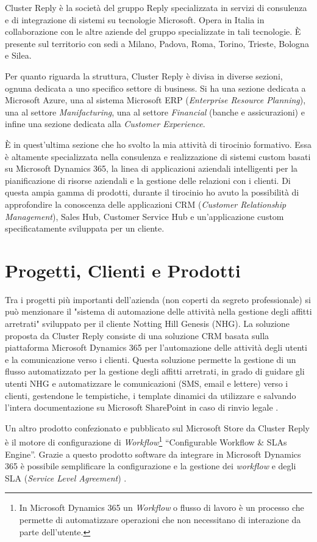 Cluster Reply è la società del gruppo Reply specializzata in servizi di consulenza e di integrazione di sistemi su tecnologie Microsoft. Opera in Italia in collaborazione con le altre aziende del gruppo specializzate in tali tecnologie. È presente sul territorio con sedi a Milano, Padova, Roma, Torino, Trieste, Bologna e Silea. 

Per quanto riguarda la struttura, Cluster Reply è divisa in diverse sezioni, ognuna dedicata a uno specifico settore di business. Si ha una sezione dedicata a Microsoft Azure, una al sistema Microsoft ERP (\textit{Enterprise Resource Planning}), una al settore \textit{Manifacturing}, una al settore \textit{Financial} (banche e assicurazioni) e infine una sezione dedicata alla \textit{Customer Experience}.

È in quest'ultima sezione che ho svolto la mia attività di tirocinio formativo. Essa è altamente specializzata nella consulenza e realizzazione di sistemi custom basati su Microsoft Dynamics 365, la linea di applicazioni aziendali intelligenti per la pianificazione di risorse aziendali e la gestione delle relazioni con i clienti. Di questa ampia gamma di prodotti, durante il tirocinio ho avuto la possibilità di approfondire la conoscenza delle applicazioni CRM (\textit{Customer Relationship Management}), Sales Hub, Customer Service Hub e un'applicazione custom specificatamente sviluppata per un cliente.

\section{Progetti, Clienti e Prodotti}
Tra i progetti più importanti dell'azienda (non coperti da segreto professionale) si può menzionare il "sistema di automazione delle attività nella gestione degli affitti arretrati" sviluppato per il cliente Notting Hill Genesis (NHG). La soluzione proposta da Cluster Reply consiste di una soluzione CRM basata sulla piattaforma Microsoft Dynamics 365 per l'automazione  delle attività degli utenti e la comunicazione verso i clienti. Questa soluzione permette la gestione di un flusso automatizzato per la gestione degli affitti arretrati, in grado di guidare gli utenti NHG e automatizzare le comunicazioni (SMS, email e lettere) verso i clienti, gestendone le tempistiche, i template dinamici da utilizzare e salvando l'intera documentazione su Microsoft SharePoint in caso di rinvio legale \cite{NHG}.

Un altro prodotto confezionato e pubblicato sul Microsoft Store da Cluster Reply è il motore di configurazione di \textit{Workflow}\footnote{In Microsoft Dynamics 365 un \textit{Workflow} o flusso di lavoro è un processo che permette di automatizzare operazioni che non necessitano di interazione da parte dell'utente.} “Configurable Workflow \& SLAs Engine”. Grazie a questo prodotto software da integrare in Microsoft Dynamics 365 è possibile semplificare la configurazione e la gestione dei \textit{workflow} e degli SLA (\textit{Service Level Agreement}) \cite{configurableWorkflow}.


